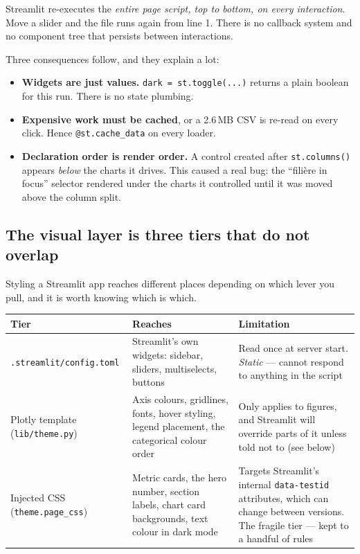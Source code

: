 \documentclass[11pt,a4paper]{article}
\newcommand{\file}[1]{\texttt{#1}}
\begin{document}
Streamlit re-executes the \emph{entire page script, top to bottom, on every
interaction}. Move a slider and the file runs again from line 1. There is no
callback system and no component tree that persists between interactions.

Three consequences follow, and they explain a lot:

\begin{itemize}
  \item \textbf{Widgets are just values.} \file{dark = st.toggle(...)} returns a
        plain boolean for this run. There is no state plumbing.
  \item \textbf{Expensive work must be cached}, or a 2.6\,MB CSV is re-read on
        every click. Hence \file{@st.cache\_data} on every loader.
  \item \textbf{Declaration order is render order.} A control created after
        \file{st.columns()} appears \emph{below} the charts it drives. This
        caused a real bug: the ``filière in focus'' selector rendered under the
        charts it controlled until it was moved above the column split.
\end{itemize}

\subsection{The visual layer is three tiers that do not overlap}

Styling a Streamlit app reaches different places depending on which lever you
pull, and it is worth knowing which is which.

\begin{longtable}{@{}L{3.9cm}L{5.0cm}L{5.4cm}@{}}
\toprule
\textbf{Tier} & \textbf{Reaches} & \textbf{Limitation} \\
\midrule
\endhead
\file{.streamlit/}\newline\file{config.toml} &
Streamlit's own widgets: sidebar, sliders, multiselects, buttons &
Read once at server start. \emph{Static} --- cannot respond to anything in the
script \\
\addlinespace
Plotly template
(\file{lib/theme.py}) &
Axis colours, gridlines, fonts, hover styling, legend placement, the
categorical colour order &
Only applies to figures, and Streamlit will override parts of it unless told
not to (see below) \\
\addlinespace
Injected CSS
(\file{theme.page\_css}) &
Metric cards, the hero number, section labels, chart card backgrounds, text
colour in dark mode &
Targets Streamlit's internal \file{data-testid} attributes, which can change
between versions. The fragile tier --- kept to a handful of rules \\
\bottomrule
\end{longtable}
\end{document}
